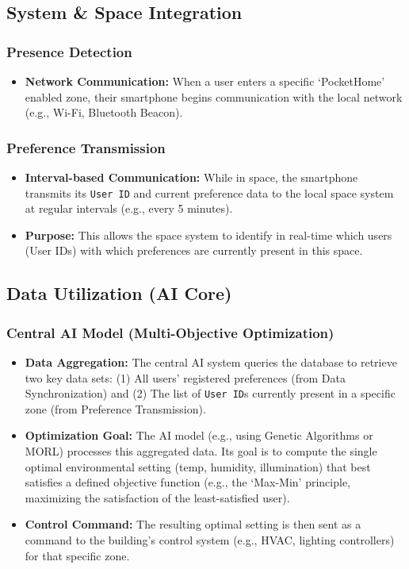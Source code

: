 \documentclass[conference]{IEEEtran}
\begin{document}
\subsection{System \& Space Integration}
\subsubsection{Presence Detection}
\begin{itemize}
    \item \textbf{Network Communication:} When a user enters a specific `PocketHome' enabled zone, their smartphone begins communication with the local network (e.g., Wi-Fi, Bluetooth Beacon).
\end{itemize}

\subsubsection{Preference Transmission}
\begin{itemize}
    \item \textbf{Interval-based Communication:} While in space, the smartphone transmits its \texttt{User ID} and current preference data to the local space system at regular intervals (e.g., every 5 minutes).
    \item \textbf{Purpose:} This allows the space system to identify in real-time which users (User IDs) with which preferences are currently present in this space.
\end{itemize}

\subsection{Data Utilization (AI Core)}
\subsubsection{Central AI Model (Multi-Objective Optimization)}
\begin{itemize}
    \item \textbf{Data Aggregation:} The central AI system queries the database to retrieve two key data sets: (1) All users' registered preferences (from Data Synchronization) and (2) The list of \texttt{User ID}s currently present in a specific zone (from Preference Transmission).
    \item \textbf{Optimization Goal:} The AI model (e.g., using Genetic Algorithms or MORL) processes this aggregated data. Its goal is to compute the single optimal environmental setting (temp, humidity, illumination) that best satisfies a defined objective function (e.g., the `Max-Min' principle, maximizing the satisfaction of the least-satisfied user).
    \item \textbf{Control Command:} The resulting optimal setting is then sent as a command to the building's control system (e.g., HVAC, lighting controllers) for that specific zone.
\end{itemize}
\end{document}
